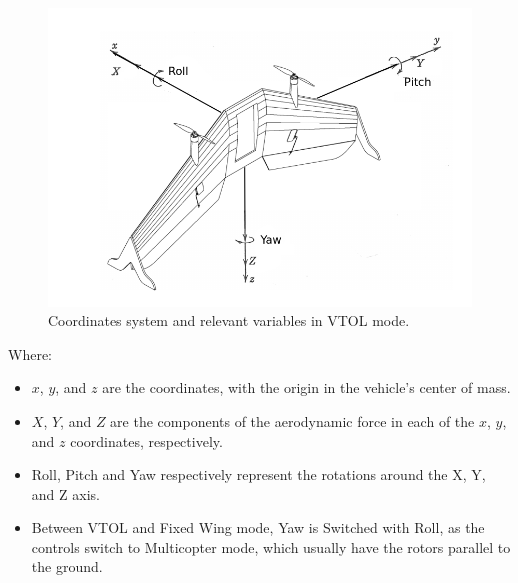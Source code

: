 \begin{figure}[h]
\centering
  \includegraphics[width=0.8\linewidth]{figs/axisvtol.png}
  \caption{Coordinates system and relevant variables in VTOL mode.}
  \label{fig:coords1}
\end{figure}

Where:


\begin{itemize}

\item $x$, $y$, and $z$ are the coordinates, with the origin in the vehicle's center of mass.
\item $X$, $Y$, and $Z$ are the components of the aerodynamic force in each of the $x$, $y$, and $z$ coordinates, respectively.
\item Roll, Pitch and Yaw respectively represent the rotations around the X, Y, and Z axis.
\item Between VTOL and Fixed Wing mode, Yaw is Switched with Roll, as the controls switch to Multicopter mode, which usually have the rotors parallel to the ground.


\end{itemize}

